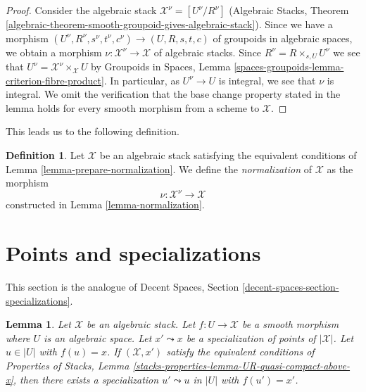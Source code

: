 \documentclass{stacks-project}
\theoremstyle{plain}
\newtheorem{lemma}[subsection]{Lemma}
\theoremstyle{definition}
\newtheorem{definition}[subsection]{Definition}
\theoremstyle{remark}
\numberwithin{equation}{subsection}
\begin{document}
\begin{proof}
\medskip\noindent
Consider the algebraic stack $\mathcal{X}^\nu = [U^\nu/R^\nu]$
(Algebraic Stacks, Theorem
\ref{algebraic-theorem-smooth-groupoid-gives-algebraic-stack}).
Since we have a morphism
$(U^\nu, R^\nu, s^\nu, t^\nu, c^\nu) \to (U, R, s, t, c)$
of groupoids in algebraic spaces, we obtain a morphism
$\nu : \mathcal{X}^\nu \to \mathcal{X}$ of algebraic stacks.
Since $R^\nu = R \times_{s, U} U^\nu$ we see that
$U^\nu = \mathcal{X}^\nu \times_\mathcal{X} U$ by
Groupoids in Spaces, Lemma
\ref{spaces-groupoids-lemma-criterion-fibre-product}.
In particular, as $U^\nu \to U$ is integral, we see that $\nu$ is integral.
We omit the verification that the base change property
stated in the lemma holds for every smooth morphism from a scheme to
$\mathcal{X}$.
\end{proof}

\noindent
This leads us to the following definition.

\begin{definition}
\label{definition-normalization}
Let $\mathcal{X}$ be an algebraic stack satisfying the
equivalent conditions of Lemma \ref{lemma-prepare-normalization}.
We define the {\it normalization} of $\mathcal{X}$ as the morphism
$$
\nu : \mathcal{X}^\nu \longrightarrow \mathcal{X}
$$
constructed in Lemma \ref{lemma-normalization}.
\end{definition}










\section{Points and specializations}
\label{section-specializations}

\noindent
This section is the analogue of
Decent Spaces, Section \ref{decent-spaces-section-specializations}.

\begin{lemma}
\label{lemma-specialization}
Let $\mathcal{X}$ be an algebraic stack. Let $f : U \to \mathcal{X}$
be a smooth morphism where $U$ is an algebraic space. Let
$x' \leadsto x$ be a specialization of points of $|\mathcal{X}|$.
Let $u \in |U|$ with $f(u) = x$. If $(\mathcal{X}, x')$ satisfy the
equivalent conditions of Properties of Stacks,
Lemma \ref{stacks-properties-lemma-UR-quasi-compact-above-x},
then there exists a specialization
$u' \leadsto u$ in $|U|$ with $f(u') = x'$.
\end{lemma}
\end{document}
